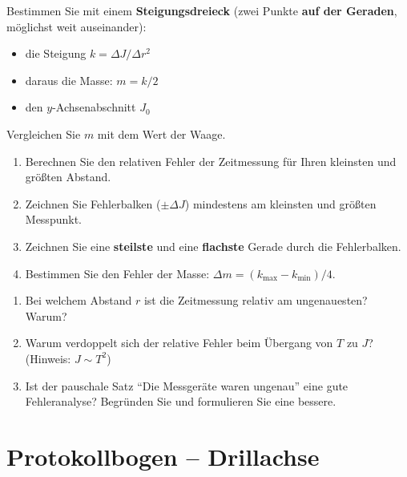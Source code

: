 \documentclass[11pt,a4paper]{scrartcl}
\begin{document}
\begin{aufgabe}[title={\faIcon{pencil-alt} Aufgabe 4: Steigung und $y$-Achsenabschnitt}]
	Bestimmen Sie mit einem \textbf{Steigungsdreieck} (zwei Punkte \textbf{auf der Geraden}, möglichst weit auseinander):
	\begin{itemize}
		\item die Steigung $k = \Delta J / \Delta r^2$
		\item daraus die Masse: $m = k/2$
		\item den $y$-Achsenabschnitt $J_0$
	\end{itemize}
	Vergleichen Sie $m$ mit dem Wert der Waage.
\end{aufgabe}

\begin{aufgabe}[title={\faIcon{pencil-alt} Aufgabe 5: Fehlerabschätzung}]
	\begin{enumerate}
		\item Berechnen Sie den relativen Fehler der Zeitmessung für Ihren kleinsten und größten Abstand.
		\item Zeichnen Sie Fehlerbalken ($\pm\Delta J$) mindestens am kleinsten und größten Messpunkt.
		\item Zeichnen Sie eine \textbf{steilste} und eine \textbf{flachste} Gerade durch die Fehlerbalken.
		\item Bestimmen Sie den Fehler der Masse: $\Delta m = (k_\text{max} - k_\text{min}) / 4$.
	\end{enumerate}
\end{aufgabe}

\begin{sternaufgabe}[title={\faIcon{star} Aufgabe 6: Reflexion}]
	\begin{enumerate}
		\item Bei welchem Abstand $r$ ist die Zeitmessung relativ am ungenauesten? Warum?
		\item Warum verdoppelt sich der relative Fehler beim Übergang von $T$ zu $J$? (Hinweis: $J \sim T^2$)
		\item Ist der pauschale Satz ``Die Messgeräte waren ungenau'' eine gute Fehleranalyse? Begründen Sie und formulieren Sie eine bessere.
	\end{enumerate}
\end{sternaufgabe}

\newpage
\section*{Protokollbogen -- Drillachse}
\end{document}
